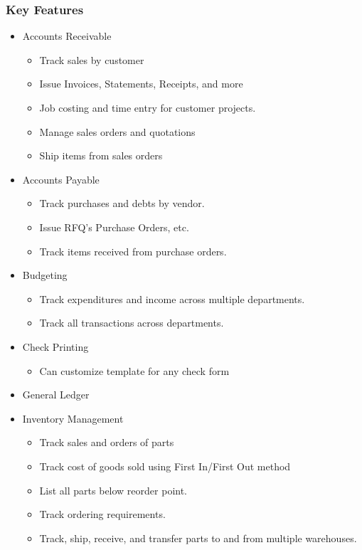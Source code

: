 \documentclass{article}
\begin{document}
\subsubsection{Key Features}
\begin{itemize}
\item Accounts Receivable
  \begin{itemize}
  \item Track sales by customer
  \item Issue Invoices, Statements, Receipts, and more
  \item Job costing and time entry for customer projects.
  \item Manage sales orders and quotations
  \item Ship items from sales orders
  \end{itemize}
\item Accounts Payable
  \begin{itemize}
  \item Track purchases and debts by vendor.
  \item Issue RFQ's Purchase Orders, etc.
  \item Track items received from purchase orders.
  \end{itemize}
\item Budgeting
  \begin{itemize}
  \item Track expenditures and income across multiple departments.
  \item Track all transactions across departments.
  \end{itemize}
\item Check Printing
  \begin{itemize}
  \item Can customize template for any check form
  \end{itemize}
\item General Ledger
\item Inventory Management
  \begin{itemize}
  \item Track sales and orders of parts
  \item Track cost of goods sold using First In/First Out method
  \item List all parts below reorder point.
  \item Track ordering requirements.
  \item Track, ship, receive, and transfer parts to and from multiple
	warehouses.
  \end{itemize}

\end{itemize}
\end{document}
